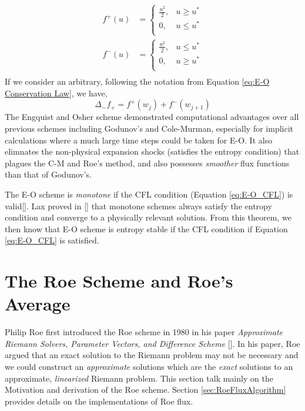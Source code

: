 \documentclass[a4paper]{article}
\numberwithin{equation}{section}
\begin{document}
\begin{equation}
    \begin{split}
        f^+ (u) &= 
        \begin{cases}
            \frac{u^2}{2}, & u \geq u^*\\
            0, & u \leq u^*\\
        \end{cases}\\
        f^-(u) &= 
        \begin{cases}
            \frac{u^2}{2}, & u \leq u^* \\
            0, & u \geq u^*\\
        \end{cases}\\
    \end{split}
\end{equation}
If we consider an arbitrary, following the notation from Equation \ref{eq:E-O Conservation Law}, we have, 
\begin{equation}
    \Delta_- f_+ = f^+(w_j) + f^-({w_{j+1}})
\end{equation}
The Engquist and Osher scheme demonstrated computational advantages over all previous schemes including Godunov's and Cole-Murman, especially for implicit calculations where a much large time steps could be taken for E-O. It also elimnates the non-physical expansion shocks (satisfies the entropy condition) that plagues the C-M and Roe's method, and also possesses \textit{smoother} flux functions than that of Godunov's.

The E-O scheme is \textit{monotone} if the CFL condition (Equation \ref{eq:E-O_CFL}) is valid[]. Lax proved in [] that monotone schemes always satisfy the entropy condition and converge to a physically relevant solution. From this theorem, we then know that E-O scheme is entropy stable if the CFL condition if Equation \ref{eq:E-O_CFL} is satisfied.

\section{The Roe Scheme and Roe's Average}
Philip Roe first introduced the Roe scheme in 1980 in his paper \textit{Approximate Riemann Solvers, Parameter Vectors, and Difference Scheme} []. In his paper, Roe argued that an exact solution to the Riemann problem may not be necessary and we could construct an \textit{approximate} solutions which are the \textit{exact} solutions to an approximate, \textit{linearized} Riemann problem. This section talk mainly on the Motivation and derivation of the Roe scheme. Section \ref{sec:RoeFluxAlgorithm} provides details on the implementations of Roe flux. 
\end{document}
